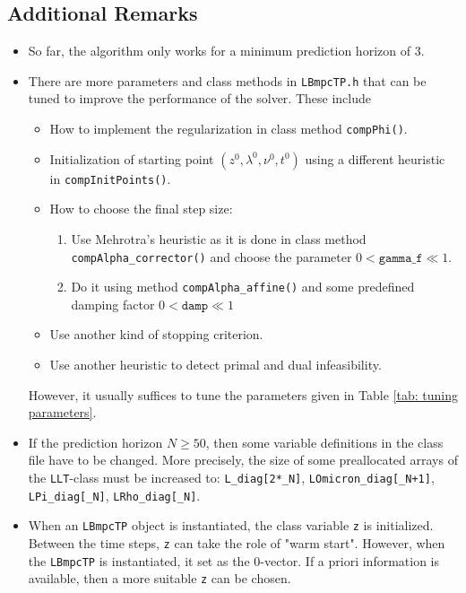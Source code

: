 \documentclass[letter]{article}
\begin{document}
\begin{sffamily}
\subsection{Additional Remarks}
\begin{itemize}
	\item So far, the algorithm only works for a minimum prediction horizon of $3$.
	\item There are more parameters and class methods in \texttt{LBmpcTP.h} that can be tuned to improve the performance of the solver. These include
	\begin{itemize}
		\item How to implement the regularization in class method \texttt{compPhi()}.
		\item Initialization of starting point $(z^0,\lambda^0,\nu^0,t^0)$ using a different heuristic in \texttt{compInitPoints()}.
		\item How to choose the final step size: 
		\begin{enumerate}
			\item Use Mehrotra's heuristic as it is done in  class method \texttt{compAlpha\_corrector()} and choose the parameter $0<\texttt{gamma\_f}\ll 1$.
			\item Do it using method \texttt{compAlpha\_affine()} and some predefined damping factor $0<\texttt{damp}\ll 1$
		\end{enumerate}
		\item Use another kind of stopping criterion.
		\item Use another heuristic to detect primal and dual infeasibility.
	\end{itemize}		
 However, it usually suffices to tune  the parameters given in Table \eqref{tab: tuning parameters}.
 
	\item If the prediction horizon $N\geq50$, then some variable definitions in the class file have to be changed. More precisely, the size of some preallocated arrays of the \texttt{LLT}-class must be increased to: \texttt{L\_diag[2*\_N]}, \texttt{LOmicron\_diag[\_N+1]}, \texttt{LPi\_diag[\_N]}, \texttt{LRho\_diag[\_N]}.
	
	\item When an \texttt{LBmpcTP} object is instantiated, the class variable \texttt{z} is initialized. Between the time steps, \texttt{z} can take  the role of "warm start". However, when the \texttt{LBmpcTP} is instantiated, it set as the $0$-vector. If a priori information is available, then a more suitable \texttt{z} can be chosen.
\end{itemize}




\end{sffamily}
\end{document}
